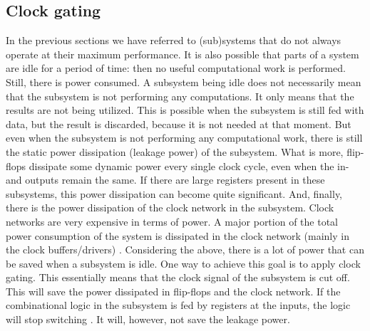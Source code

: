  \subsection{Clock gating}
 In the previous sections we have referred to (sub)systems that do not always operate 
 at their maximum performance. It is also possible that parts of a system are idle for a 
 period of time: then no useful computational work is performed. Still, there is power 
 consumed. A subsystem being idle does not necessarily mean that the subsystem is not 
 performing any computations. It only means that the results are not being utilized. This 
 is possible when the subsystem is still fed with data, but the result is discarded, because 
 it is not needed at that moment. But even when the subsystem is not performing 
 any computational work, there is still the static power dissipation (leakage power) of 
 the subsystem. What is more, flip-flops dissipate some dynamic power every single clock 
 cycle, even when the in- and outputs remain the same. If there are large registers present 
 in these subsystems, this power dissipation can become quite significant. And, finally, 
 there is the power dissipation of the clock network in the subsystem. Clock networks 
 are very expensive in terms of power. A major portion of the total power consumption 
 of the system is dissipated in the clock network (mainly in the clock buffers/drivers) \cite{LowPowerMethod}. 
 Considering the above, there is a lot of power that can be saved when a subsystem 
 is idle. One way to achieve this goal is to apply clock gating. This essentially means 
 that the clock signal of the subsystem is cut off. This will save the power dissipated in 
 flip-flops and the clock network. If the combinational logic in the subsystem is fed by 
 registers at the inputs, the logic will stop switching \cite{DesignLowPower}. It will, however, not save the 
 leakage power.
 
